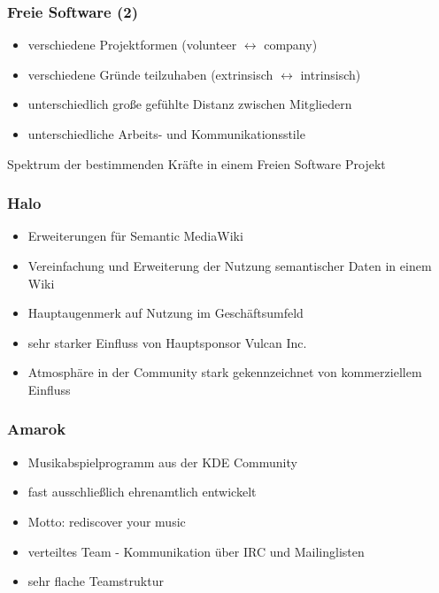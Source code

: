 \documentclass{beamer}
\begin{document}
\begin{frame}
\frametitle{Freie Software (2)}
\begin{itemize}
 \item verschiedene Projektformen (volunteer $\leftrightarrow$ company)
 \item verschiedene Gr\"unde teilzuhaben (extrinsisch $\leftrightarrow$ intrinsisch)
 \item unterschiedlich gro\ss e gef\"uhlte Distanz zwischen Mitgliedern
 \item unterschiedliche Arbeits- und Kommunikationsstile
\end{itemize}

\begin{block}{Spektrum der bestimmenden Kr\"afte in einem Freien Software Projekt}
\begin{figure}[h]
	\centering
\end{figure}
\end{block}
\end{frame}

\begin{frame}
\frametitle{Halo}
\begin{itemize}
 \item Erweiterungen f\"ur Semantic MediaWiki
 \item Vereinfachung und Erweiterung der Nutzung semantischer Daten in einem Wiki
 \item Hauptaugenmerk auf Nutzung im Gesch\"aftsumfeld
 \item sehr starker Einfluss von Hauptsponsor Vulcan Inc.
 \item Atmosph\"are in der Community stark gekennzeichnet von kommerziellem Einfluss
\end{itemize}
\end{frame}

\begin{frame}
\frametitle{Amarok}
\begin{itemize}
 \item Musikabspielprogramm aus der KDE Community
 \item fast ausschlie\ss lich ehrenamtlich entwickelt
 \item Motto: rediscover your music
 \item verteiltes Team - Kommunikation \"uber IRC und Mailinglisten
 \item sehr flache Teamstruktur
\end{itemize}
\end{frame}
\end{document}

